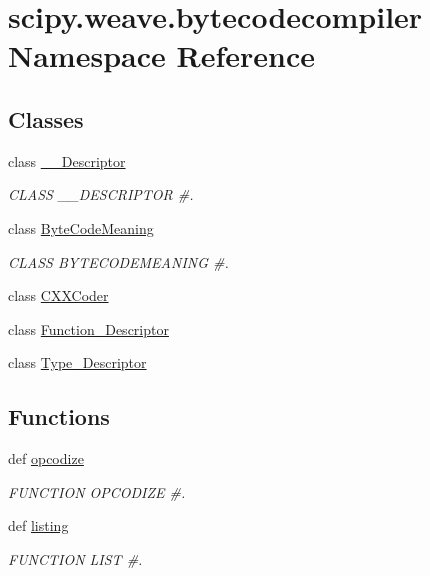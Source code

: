 \hypertarget{namespacescipy_1_1weave_1_1bytecodecompiler}{}\section{scipy.\+weave.\+bytecodecompiler Namespace Reference}
\label{namespacescipy_1_1weave_1_1bytecodecompiler}
\subsection*{Classes}
\begin{DoxyCompactItemize}
\item 
class \hyperlink{classscipy_1_1weave_1_1bytecodecompiler_1_1____Descriptor}{\+\_\+\+\_\+\+Descriptor}
\begin{DoxyCompactList}\small\item\em C\+L\+A\+S\+S \+\_\+\+\_\+\+D\+E\+S\+C\+R\+I\+P\+T\+O\+R \#. \end{DoxyCompactList}\item 
class \hyperlink{classscipy_1_1weave_1_1bytecodecompiler_1_1ByteCodeMeaning}{Byte\+Code\+Meaning}
\begin{DoxyCompactList}\small\item\em C\+L\+A\+S\+S B\+Y\+T\+E\+C\+O\+D\+E\+M\+E\+A\+N\+I\+N\+G \#. \end{DoxyCompactList}\item 
class \hyperlink{classscipy_1_1weave_1_1bytecodecompiler_1_1CXXCoder}{C\+X\+X\+Coder}
\item 
class \hyperlink{classscipy_1_1weave_1_1bytecodecompiler_1_1Function__Descriptor}{Function\+\_\+\+Descriptor}
\item 
class \hyperlink{classscipy_1_1weave_1_1bytecodecompiler_1_1Type__Descriptor}{Type\+\_\+\+Descriptor}
\end{DoxyCompactItemize}
\subsection*{Functions}
\begin{DoxyCompactItemize}
\item 
def \hyperlink{namespacescipy_1_1weave_1_1bytecodecompiler_a8fdc3eaf86cb4e1723e12e23293d458d}{opcodize}
\begin{DoxyCompactList}\small\item\em F\+U\+N\+C\+T\+I\+O\+N O\+P\+C\+O\+D\+I\+Z\+E \#. \end{DoxyCompactList}\item 
def \hyperlink{namespacescipy_1_1weave_1_1bytecodecompiler_aba838e651a83ecad4d7c60e6b7910c26}{listing}
\begin{DoxyCompactList}\small\item\em F\+U\+N\+C\+T\+I\+O\+N L\+I\+S\+T \#. \end{DoxyCompactList}\end{DoxyCompactItemize}
